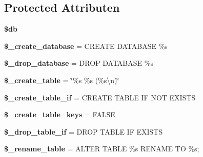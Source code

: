 \subsection*{Protected Attributen}
\begin{DoxyCompactItemize}
\item 
\mbox{\label{class_c_i___d_b__forge_a1fa3127fc82f96b1436d871ef02be319}} 
{\bfseries \$db}
\item 
\mbox{\label{class_c_i___d_b__forge_acd23c9a8735806155f1a5d0a87c151f2}} 
{\bfseries \$\+\_\+create\+\_\+database} = \textquotesingle{}C\+R\+E\+A\+TE D\+A\+T\+A\+B\+A\+SE \%s\textquotesingle{}
\item 
\mbox{\label{class_c_i___d_b__forge_a8305b12fc17f6f87778260ebdff287b4}} 
{\bfseries \$\+\_\+drop\+\_\+database} = \textquotesingle{}D\+R\+OP D\+A\+T\+A\+B\+A\+SE \%s\textquotesingle{}
\item 
\mbox{\label{class_c_i___d_b__forge_a5950510a854f546e14f781b079a0a2b0}} 
{\bfseries \$\+\_\+create\+\_\+table} = \char`\"{}\%s \%s (\%s\textbackslash{}n)\char`\"{}
\item 
\mbox{\label{class_c_i___d_b__forge_a2f6484fcb8d1dc3eef67a637227cd583}} 
{\bfseries \$\+\_\+create\+\_\+table\+\_\+if} = \textquotesingle{}C\+R\+E\+A\+TE T\+A\+B\+LE IF N\+OT E\+X\+I\+S\+TS\textquotesingle{}
\item 
\mbox{\label{class_c_i___d_b__forge_a73e07acdd35c948ad353903c2827af6e}} 
{\bfseries \$\+\_\+create\+\_\+table\+\_\+keys} = F\+A\+L\+SE
\item 
\mbox{\label{class_c_i___d_b__forge_a92a8a9145a7fc91e252e58d019373581}} 
{\bfseries \$\+\_\+drop\+\_\+table\+\_\+if} = \textquotesingle{}D\+R\+OP T\+A\+B\+LE IF E\+X\+I\+S\+TS\textquotesingle{}
\item 
\mbox{\label{class_c_i___d_b__forge_a1a649e7cf9de16bcf932977b18bc91de}} 
{\bfseries \$\+\_\+rename\+\_\+table} = \textquotesingle{}A\+L\+T\+ER T\+A\+B\+LE \%s R\+E\+N\+A\+ME TO \%s;\textquotesingle{}
\item 

\end{DoxyCompactItemize}
